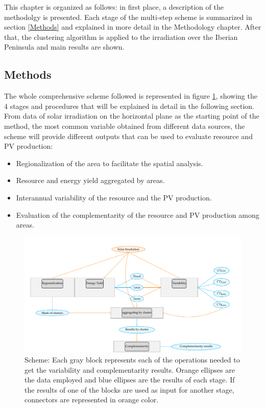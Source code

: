 This chapter is organized as follows: in first place, a description of the methodolgy is presented. Each stage of the multi-step scheme is summarized in section \ref{Methods} and explained in more detail in the Methodology chapter. After that, the clustering algorithm is applied to the irradiation over the Iberian Peninsula and main results are shown.\\

\subsection{Methods}

The whole comprehensive scheme followed is represented in figure \ref{fig:multi_step}, showing the 4 stages and procedures that will be explained in detail in the following section.\\

From data of solar irradiation on the horizontal plane as the starting point of the method, the most common variable obtained from different data sources, the scheme will provide different outputs that can be used to evaluate resource and PV production:\\

\begin{itemize}
\item Regionalization of the area to facilitate the spatial analysis.
\item Resource and energy yield aggregated by areas.
\item Interannual variability of the resource and the PV production.
\item Evaluation of the complementarity of the resource and PV production among areas.
\end{itemize}  
 
\begin{figure}[h!]
\centering\includegraphics[width=1\textwidth]{figs/capitulo5/multi_step}
\caption{Scheme: Each gray block represents each of the operations needed to get the variability and complementarity results. Orange ellipses are the data employed and blue ellipses are the results of each stage. If the results of one of the blocks are used as input for another stage, connectors are represented in orange color.}
\label{fig:multi_step}
\end{figure}

